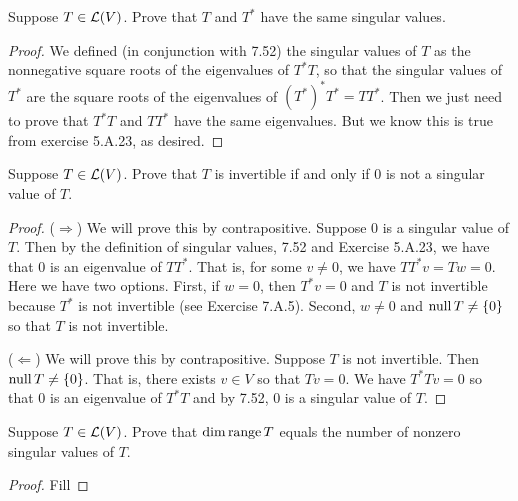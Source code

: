 \begin{exercise}{11}
  Suppose $T\in\mathcal{L}(V)$. Prove that $T$ and $T^\ast$ have the same singular values.
\end{exercise}
\begin{proof}
 We defined (in conjunction with 7.52) the singular values of $T$ as the nonnegative square roots of the eigenvalues of $T^\ast T$, so that the singular values of $T^\ast$ are the square roots of the eigenvalues of $(T^\ast)^\ast T^\ast =TT^\ast$. Then we just need to prove that $T^\ast T$ and $TT^\ast$ have the same eigenvalues. But we know this is true from exercise 5.A.23, as desired.
\end{proof}

\begin{exercise}{13}
  Suppose $T\in\mathcal{L}(V)$. Prove that $T$ is invertible if and only if 0 is not a singular value of $T$.
\end{exercise}
\begin{proof}
 ($\Rightarrow$) We will prove this by contrapositive. Suppose 0 is a singular value of $T$. Then by the definition of singular values, 7.52 and Exercise 5.A.23, we have that 0 is an eigenvalue of $TT^\ast$. That is, for some $v\neq 0$, we have $TT^\ast v =Tw =0$. Here we have two options. First, if $w=0$, then $T^\ast v=0$ and $T$ is not invertible because $T^\ast$ is not invertible (see Exercise 7.A.5). Second, $w\neq 0$ and $\operatorname*{null} T\neq\{0\}$ so that $T$ is not invertible.

 ($\Leftarrow$) We will prove this by contrapositive. Suppose $T$ is not invertible. Then $\operatorname*{null} T\neq\{0\}$. That is, there exists $v\in V$ so that $Tv=0$. We have $T^\ast Tv =0$ so that $0$ is an eigenvalue of $T^\ast T$ and by 7.52, 0 is a singular value of $T$.
\end{proof}

\begin{exercise}{14}
  Suppose $T\in\mathcal{L}(V)$. Prove that $\dim\operatorname*{range} T$ equals the number of nonzero singular values of $T$.
\end{exercise}
\begin{proof}
 Fill
\end{proof}

